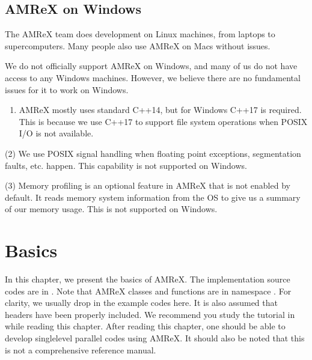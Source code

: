 \documentclass[letterpaper,10pt,english]{sphinxmanual}
\begin{document}
\section{AMReX on Windows}
\label{\detokenize{BuildingAMReX:amrex-on-windows}}\label{\detokenize{BuildingAMReX:sec-build-windows}}
\sphinxAtStartPar
The AMReX team does development on Linux machines, from laptops to supercomputers. Many people also use AMReX on Macs without issues.

\sphinxAtStartPar
We do not officially support AMReX on Windows, and many of us do not have access to any Windows
machines.  However, we believe there are no fundamental issues for it to work on Windows.
\begin{enumerate}
%
\item {} 
\sphinxAtStartPar
AMReX mostly uses standard C++14, but for Windows C++17 is required.  This is because we use
C++17 to support file system operations when POSIX I/O is not available.

\end{enumerate}

\sphinxAtStartPar
(2) We use POSIX signal handling when floating point exceptions, segmentation faults, etc. happen.
This capability is not supported on Windows.

\sphinxAtStartPar
(3) Memory profiling is an optional feature in AMReX that is not enabled by default.  It reads
memory system information from the OS to give us a summary of our memory usage.  This is not
supported on Windows.


\chapter{Basics}
\label{\detokenize{Basics_Chapter:basics}}\label{\detokenize{Basics_Chapter:chap-basics}}\label{\detokenize{Basics_Chapter::doc}}
\sphinxAtStartPar
In this chapter, we present the basics of AMReX. The implementation source
codes are in . Note that AMReX classes and functions are in
namespace . For clarity, we usually drop  in the example
codes here. It is also assumed that headers have been properly included. We
recommend you study the tutorial in
 while reading this chapter.  After
reading this chapter, one should be able to develop single\sphinxhyphen{}level parallel codes
using AMReX. It should also be noted that this is not a comprehensive reference
manual.
\end{document}
